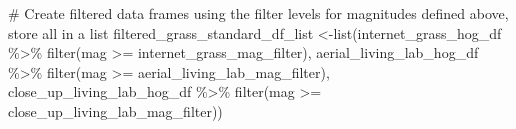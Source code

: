 \documentclass[
  letterpaper,
  DIV=11,
  numbers=noendperiod]{scrreprt}
\newenvironment{Shaded}{\begin{snugshade}}{\end{snugshade}}
\newcommand{\CommentTok}[1]{\textcolor[rgb]{0.37,0.37,0.37}{#1}}
\newcommand{\FunctionTok}[1]{\textcolor[rgb]{0.28,0.35,0.67}{#1}}
\newcommand{\NormalTok}[1]{\textcolor[rgb]{0.00,0.23,0.31}{#1}}
\newcommand{\OtherTok}[1]{\textcolor[rgb]{0.00,0.23,0.31}{#1}}
\newcommand{\SpecialCharTok}[1]{\textcolor[rgb]{0.37,0.37,0.37}{#1}}
\begin{document}
\begin{Shaded}
\begin{Highlighting}[]
\CommentTok{\# Create filtered data frames using the filter levels for magnitudes defined above, store all in a list}
\NormalTok{filtered\_grass\_standard\_df\_list }\OtherTok{\textless{}{-}}\FunctionTok{list}\NormalTok{(internet\_grass\_hog\_df }\SpecialCharTok{\%\textgreater{}\%}
                                          \FunctionTok{filter}\NormalTok{(mag }\SpecialCharTok{\textgreater{}=}\NormalTok{ internet\_grass\_mag\_filter),}
\NormalTok{                                        aerial\_living\_lab\_hog\_df }\SpecialCharTok{\%\textgreater{}\%}
                                          \FunctionTok{filter}\NormalTok{(mag }\SpecialCharTok{\textgreater{}=}\NormalTok{ aerial\_living\_lab\_mag\_filter), }
\NormalTok{                                        close\_up\_living\_lab\_hog\_df }\SpecialCharTok{\%\textgreater{}\%}
                                          \FunctionTok{filter}\NormalTok{(mag }\SpecialCharTok{\textgreater{}=}\NormalTok{ close\_up\_living\_lab\_mag\_filter))}
\end{Highlighting}
\end{Shaded}
\end{document}
